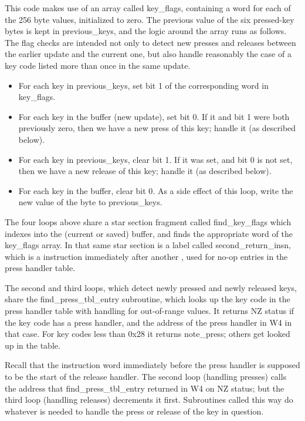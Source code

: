 This code makes use of an array called key\_flags, containing a word for
each of the 256 byte values, initialized to zero.  The previous value of the
six pressed-key bytes is kept in previous\_keys, and the logic around the
array runs as follows.  The flag checks are intended not only to detect new
presses and releases between the earlier update and the current one, but
also handle reasonably the case of a key code listed more than once in the
same update.

\begin{itemize}
  \item For each key in previous\_keys, set bit 1 of the corresponding word
    in key\_flags.
  \item For each key in the buffer (new update), set bit 0.  If it and bit 1
    were both previously zero, then we have a new press of this key; handle
    it (as described below).
  \item For each key in previous\_keys, clear bit 1.  If it was set, and bit
    0 is not set, then we have a new release of this key; handle it (as
    described below).
  \item For each key in the buffer, clear bit 0.  As a side effect of this
    loop, write the new value of the byte to previous\_keys.
\end{itemize}

The four loops above share a star section fragment called find\_key\_flags
which indexes into the (current or saved) buffer, and finds the appropriate
word of the key\_flags array.  In that same star section is a label called
second\_return\_insn, which is a  instruction immediately after
another , used for no-op entries in the press handler table.

The second and third loops, which detect newly pressed and newly released
keys, share the find\_press\_tbl\_entry subroutine, which looks up the key
code in the press handler table with handling for out-of-range values.  It
returns NZ status if the key code has a press handler, and the address of
the press handler in W4 in that case.  For key codes less than 0x28 it
returns note\_press; others get looked up in the table.

Recall that the instruction word immediately before the press handler is
supposed to be the start of the release handler.  The second loop (handling
presses) calls the address that find\_press\_tbl\_entry returned in W4 on NZ
status; but the third loop (handling releases) decrements it first. 
Subroutines called this way do whatever is needed to handle the press or
release of the key in question.

